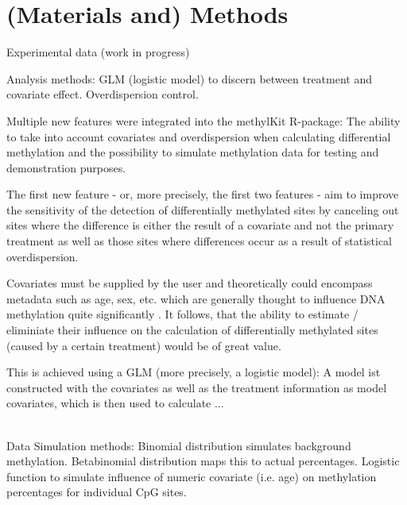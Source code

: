 \section{(Materials and) Methods}

Experimental data (work in progress)

Analysis methods: GLM (logistic model) to discern between treatment and covariate effect. 
Overdispersion control.

Multiple new features were integrated into the methylKit R-package: The ability to take into account covariates and overdispersion when calculating differential methylation and the possibility to simulate methylation data for testing and demonstration purposes.

The first new feature - or, more precisely, the first two features - aim to  improve the sensitivity of the detection of differentially methylated sites by canceling out sites where the difference is either the result of a covariate and not the primary treatment as well as those sites where differences occur as a result of statistical overdispersion.

Covariates must be supplied by the user and theoretically could encompass metadata such as age, sex, etc. which are generally thought to influence DNA methylation quite significantly \cite{24561809}. It follows, that the ability to estimate / eliminiate their influence on the calculation of differentially methylated sites (caused by a certain treatment) would be of great value.

This is achieved using a GLM (more precisely, a logistic model): A model ist constructed with the covariates as well as the treatment information as model covariates, which is then used to calculate ...

\\
Data Simulation methods: Binomial distribution simulates background methylation. 
Betabinomial distribution maps this to actual percentages.
Logistic function to simulate influence of numeric covariate (i.e. age) on methylation percentages for individual CpG sites.
  
  
  